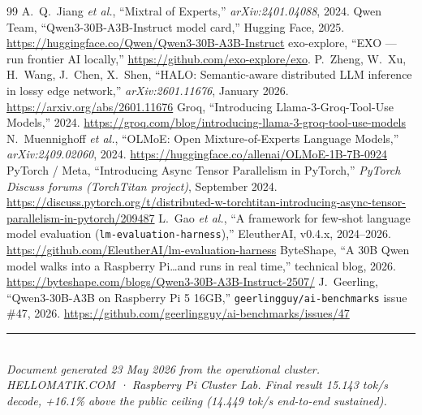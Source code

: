 \documentclass[10pt,a4paper]{article}
\begin{document}
\begin{thebibliography}{99}
 A.\ Q.\ Jiang \emph{et al.}, ``Mixtral of Experts,'' \emph{arXiv:2401.04088}, 2024.
 Qwen Team, ``Qwen3-30B-A3B-Instruct model card,'' Hugging Face, 2025. \url{https://huggingface.co/Qwen/Qwen3-30B-A3B-Instruct}
 exo-explore, ``EXO --- run frontier AI locally,'' \url{https://github.com/exo-explore/exo}.
 P.\ Zheng, W.\ Xu, H.\ Wang, J.\ Chen, X.\ Shen, ``HALO: Semantic-aware distributed LLM inference in lossy edge network,'' \emph{arXiv:2601.11676}, January 2026. \url{https://arxiv.org/abs/2601.11676}
 Groq, ``Introducing Llama-3-Groq-Tool-Use Models,'' 2024. \url{https://groq.com/blog/introducing-llama-3-groq-tool-use-models}
 N.\ Muennighoff \emph{et al.}, ``OLMoE: Open Mixture-of-Experts Language Models,'' \emph{arXiv:2409.02060}, 2024. \url{https://huggingface.co/allenai/OLMoE-1B-7B-0924}
 PyTorch / Meta, ``Introducing Async Tensor Parallelism in PyTorch,'' \emph{PyTorch Discuss forums (TorchTitan project)}, September 2024. \url{https://discuss.pytorch.org/t/distributed-w-torchtitan-introducing-async-tensor-parallelism-in-pytorch/209487}
 L.\ Gao \emph{et al.}, ``A framework for few-shot language model evaluation (\texttt{lm-evaluation-harness}),'' EleutherAI, v0.4.x, 2024--2026. \url{https://github.com/EleutherAI/lm-evaluation-harness}
 ByteShape, ``A 30B Qwen model walks into a Raspberry Pi\ldots and runs in real time,'' technical blog, 2026. \url{https://byteshape.com/blogs/Qwen3-30B-A3B-Instruct-2507/}
 J.\ Geerling, ``Qwen3-30B-A3B on Raspberry Pi 5 16GB,'' \texttt{geerlingguy/ai-benchmarks} issue \#47, 2026. \url{https://github.com/geerlingguy/ai-benchmarks/issues/47}
\end{thebibliography}

\bigskip
\begin{center}
\rule{0.6\textwidth}{0.4pt}\\[0.3cm]
\small\itshape Document generated 23 May 2026 from the operational cluster. HELLOMATIK.COM · Raspberry Pi Cluster Lab. Final result 15.143 tok/s decode, +16.1\% above the public ceiling (14.449 tok/s end-to-end sustained).
\end{center}
\end{document}
